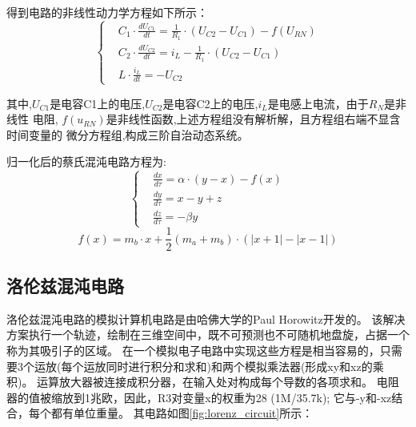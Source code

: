 \documentclass[10pt,a4paper,twoside,UTF8]{ctexart}
\begin{document}
\begin{figure}[H]
	\centering
	\caption{}
\end{figure}


得到电路的非线性动力学方程如下所示：
\[\left\{
\begin{aligned}
&C_1 \cdot \frac{d U_{C1}}{dt}=\frac{1}{R_1}\cdot \left(U_{C2}-U_{C1}\right)-f\left(U_{RN}\right) \\
&C_2 \cdot \frac{d U_{C2}}{dt}=i_L-\frac{1}{R_1}\cdot \left(U_{C2}-U_{C1}\right)\\
&L\cdot\frac{i_L}{dt}=-U_{C2}
\end{aligned}
\right.
\]

其中,$U_{C1}$是电容C1上的电压,$U_{C2}$是电容C2上的电压,$i_L$是电感上电流，由于$R_N$是非线性
电阻, $f(u_{RN})$是非线性函数,上述方程组没有解析解，且方程组右端不显含时间变量的
微分方程组,构成三阶自治动态系统。

归一化后的蔡氏混沌电路方程为:
\[\left\{
\begin{aligned}
&\frac{dx}{d\tau}=\alpha \cdot  (y-x)-f(x) \\
&\frac{dy}{d\tau}=x-y+z \\
&\frac{dz}{d\tau}=-\beta y
\end{aligned}
\right.
\]
\begin{equation*}
	f(x)=m_b \cdot x +\frac{1}{2}(m_a+m_b)\cdot (\left\lvert x+1 \right\rvert -\left\lvert x-1\right\rvert )
\end{equation*}

\subsection{洛伦兹混沌电路}
洛伦兹混沌电路的模拟计算机电路是由哈佛大学的Paul Horowitz开发的。
该解决方案执行一个轨迹，绘制在三维空间中，既不可预测也不可随机地盘旋，占据一个称为其吸引子的区域。 
在一个模拟电子电路中实现这些方程是相当容易的，只需要3个运放(每个运放同时进行积分和求和)和两个模拟乘法器(形成xy和xz的乘积)。 
运算放大器被连接成积分器，在输入处对构成每个导数的各项求和。 
电阻器的值被缩放到1兆欧，因此，R3对变量x的权重为28 (1M/35.7k); 它与-y和-xz结合，每个都有单位重量。 
其电路如图\ref{fig:lorenz_circuit}所示： 
\end{document}

